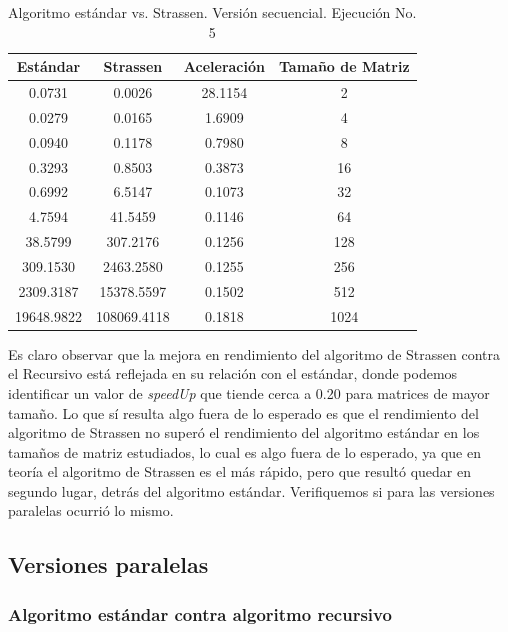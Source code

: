 \documentclass{article}
\begin{document}
\begin{table}[ht]
\centering
\begin{tabular}{|c|c|c|c|}
\hline
\textbf{Estándar} & \textbf{Strassen} & \textbf{Aceleración} & \textbf{Tamaño de Matriz} \\
\hline
0.0731 & 0.0026 & 28.1154 & 2 \\
0.0279 & 0.0165 & 1.6909 & 4 \\
0.0940 & 0.1178 & 0.7980 & 8 \\
0.3293 & 0.8503 & 0.3873 & 16 \\
0.6992 & 6.5147 & 0.1073 & 32 \\
4.7594 & 41.5459 & 0.1146 & 64 \\
38.5799 & 307.2176 & 0.1256 & 128 \\
309.1530 & 2463.2580 & 0.1255 & 256 \\
2309.3187 & 15378.5597 & 0.1502 & 512 \\
19648.9822 & 108069.4118 & 0.1818 & 1024 \\
\hline
\end{tabular}
\caption{Algoritmo estándar vs. Strassen. Versión secuencial. Ejecución No. 5}
\end{table}


Es claro observar que la mejora en rendimiento del algoritmo de Strassen contra el Recursivo está reflejada en su relación con el estándar, donde podemos identificar un valor de \textit{speedUp} que tiende cerca a 0.20 para matrices de mayor tamaño. Lo que sí resulta algo fuera de lo esperado es que el rendimiento del algoritmo de Strassen no superó el rendimiento del algoritmo estándar en los tamaños de matriz estudiados, lo cual es algo fuera de lo esperado, ya que en teoría el algoritmo de Strassen es el más rápido, pero que resultó quedar en segundo lugar, detrás del algoritmo estándar. Verifiquemos si para las versiones paralelas ocurrió lo mismo.

\subsection{Versiones paralelas}

\subsubsection{Algoritmo estándar contra algoritmo recursivo}
\end{document}
